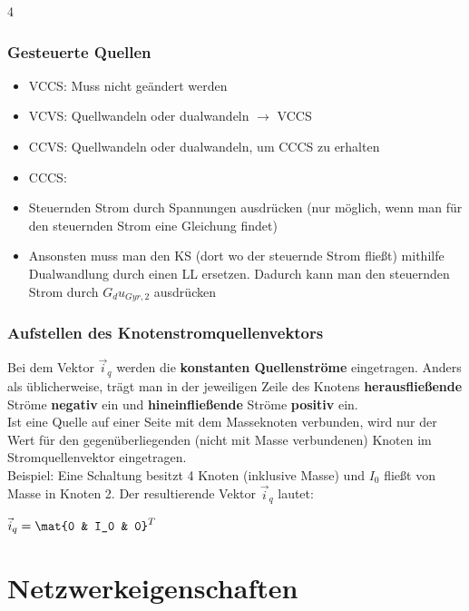 \documentclass[fs, footer]{latex4ei}
\begin{document}
\begin{multicols*}{4}
{        \subsubsection{Gesteuerte Quellen}
        \begin{itemize}
            \item VCCS: Muss nicht geändert werden
            \item VCVS: Quellwandeln oder dualwandeln $\rightarrow$ VCCS
            \item CCVS: Quellwandeln oder dualwandeln, um CCCS zu erhalten
            \item CCCS:
            \item[-] Steuernden Strom durch Spannungen ausdrücken (nur möglich, wenn man für den steuernden Strom eine Gleichung findet)
            \item[-] Ansonsten muss man den KS (dort wo der steuernde Strom fließt) mithilfe Dualwandlung durch einen LL ersetzen. Dadurch kann man den steuernden Strom durch $G_d u_{Gyr,2}$ ausdrücken
        \end{itemize}
    }

    \subsubsection{Aufstellen des Knotenstromquellenvektors}
    Bei dem Vektor $\vec i_{q}$ werden die \textbf{konstanten Quellenströme} eingetragen.
    Anders als üblicherweise, trägt man in der jeweiligen Zeile des Knotens \textbf{herausfließende} Ströme \textbf{negativ} ein und \textbf{hineinfließende} Ströme \textbf{positiv} ein.\\

    Ist eine Quelle auf einer Seite mit dem Masseknoten verbunden, wird nur der Wert für den gegenüberliegenden (nicht mit Masse verbundenen) Knoten im Stromquellenvektor eingetragen.\\

    Beispiel: Eine Schaltung besitzt 4 Knoten (inklusive Masse) und $I_0$ fließt von Masse in Knoten 2. Der resultierende Vektor $\vec i_q$ lautet:
    \begin{center} %
        $\vec i_{q} = \mat{0 & I_0 & 0}^T$
    \end{center}

    \section{Netzwerkeigenschaften}


\end{multicols*}
\end{document}
